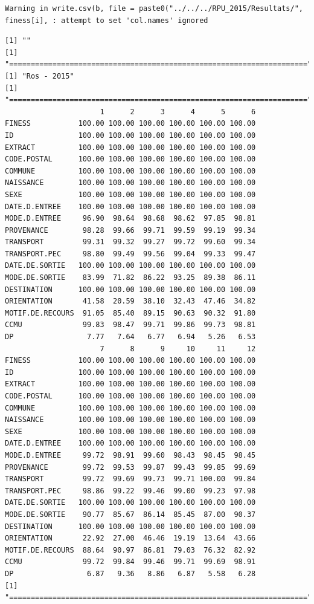 \documentclass[]{article}
\begin{document}
\begin{verbatim}
Warning in write.csv(b, file = paste0("../../../RPU_2015/Resultats/",
finess[i], : attempt to set 'col.names' ignored
\end{verbatim}

\begin{verbatim}
[1] ""
[1] "====================================================================="
[1] "Ros - 2015"
[1] "====================================================================="
                      1      2      3      4      5      6
FINESS           100.00 100.00 100.00 100.00 100.00 100.00
ID               100.00 100.00 100.00 100.00 100.00 100.00
EXTRACT          100.00 100.00 100.00 100.00 100.00 100.00
CODE.POSTAL      100.00 100.00 100.00 100.00 100.00 100.00
COMMUNE          100.00 100.00 100.00 100.00 100.00 100.00
NAISSANCE        100.00 100.00 100.00 100.00 100.00 100.00
SEXE             100.00 100.00 100.00 100.00 100.00 100.00
DATE.D.ENTREE    100.00 100.00 100.00 100.00 100.00 100.00
MODE.D.ENTREE     96.90  98.64  98.68  98.62  97.85  98.81
PROVENANCE        98.28  99.66  99.71  99.59  99.19  99.34
TRANSPORT         99.31  99.32  99.27  99.72  99.60  99.34
TRANSPORT.PEC     98.80  99.49  99.56  99.04  99.33  99.47
DATE.DE.SORTIE   100.00 100.00 100.00 100.00 100.00 100.00
MODE.DE.SORTIE    83.99  71.82  86.22  93.25  89.38  86.11
DESTINATION      100.00 100.00 100.00 100.00 100.00 100.00
ORIENTATION       41.58  20.59  38.10  32.43  47.46  34.82
MOTIF.DE.RECOURS  91.05  85.40  89.15  90.63  90.32  91.80
CCMU              99.83  98.47  99.71  99.86  99.73  98.81
DP                 7.77   7.64   6.77   6.94   5.26   6.53
                      7      8      9     10     11     12
FINESS           100.00 100.00 100.00 100.00 100.00 100.00
ID               100.00 100.00 100.00 100.00 100.00 100.00
EXTRACT          100.00 100.00 100.00 100.00 100.00 100.00
CODE.POSTAL      100.00 100.00 100.00 100.00 100.00 100.00
COMMUNE          100.00 100.00 100.00 100.00 100.00 100.00
NAISSANCE        100.00 100.00 100.00 100.00 100.00 100.00
SEXE             100.00 100.00 100.00 100.00 100.00 100.00
DATE.D.ENTREE    100.00 100.00 100.00 100.00 100.00 100.00
MODE.D.ENTREE     99.72  98.91  99.60  98.43  98.45  98.45
PROVENANCE        99.72  99.53  99.87  99.43  99.85  99.69
TRANSPORT         99.72  99.69  99.73  99.71 100.00  99.84
TRANSPORT.PEC     98.86  99.22  99.46  99.00  99.23  97.98
DATE.DE.SORTIE   100.00 100.00 100.00 100.00 100.00 100.00
MODE.DE.SORTIE    90.77  85.67  86.14  85.45  87.00  90.37
DESTINATION      100.00 100.00 100.00 100.00 100.00 100.00
ORIENTATION       22.92  27.00  46.46  19.19  13.64  43.66
MOTIF.DE.RECOURS  88.64  90.97  86.81  79.03  76.32  82.92
CCMU              99.72  99.84  99.46  99.71  99.69  98.91
DP                 6.87   9.36   8.86   6.87   5.58   6.28
[1] "====================================================================="
\end{verbatim}
\end{document}
